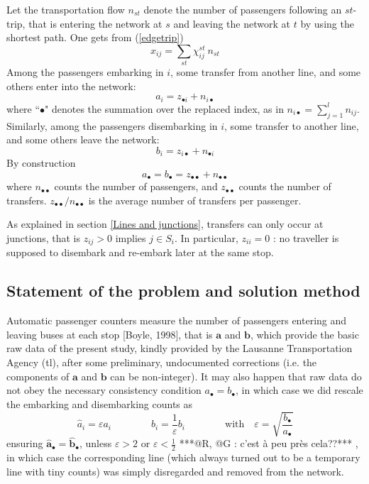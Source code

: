 \documentclass{bmcart}
\begin{document}
Let the transportation flow $n_{st}$ denote the number of passengers following an $st$-trip, that is entering the network at $s$ and leaving the network at $t$ by using the shortest path. One gets from (\ref{edgetrip}) 
\begin{equation}
\label{equationGG}
x_{ij}=\sum_{st}\chi_{ij}^{st}\:  n_{st}
\end{equation}
Among the passengers embarking in $i$, some transfer from another line, and some others enter into the network: 
\begin{equation}
\label{entrer}
a_i=z_{\bullet i}+n_{i\bullet}
\end{equation}
where  ``$\bullet$" denotes the summation over the replaced index, as in $n_{i\bullet}=\sum_{j=1}^l n_{ij}$. Similarly, among the passengers disembarking in $i$, some transfer to another line, and some others leave the network: 
\begin{equation}
\label{sortir}
b_i=z_{i\bullet}+n_{\bullet i}
\end{equation}
By construction
\begin{displaymath}
a_{\bullet}=b_{\bullet}=z_{\bullet\bullet}+n_{\bullet\bullet}
\end{displaymath}
where $n_{\bullet\bullet}$ counts the number of passengers, and $z_{\bullet\bullet}$ counts the number of transfers. $z_{\bullet\bullet}/n_{\bullet\bullet}$  is the average number of transfers per passenger. 

\vspace*{0.1cm}



As explained in section \ref{Lines and junctions}, transfers can only occur at junctions, that is $z_{ij}>0$ implies $j\in S_i$. In particular,  $z_{ii}=0$ : no traveller is supposed to disembark and re-embark later at the same stop. 


 
\subsection{Statement of the problem and solution method}
Automatic passenger counters measure the number of passengers entering and leaving buses at each stop [Boyle, 1998], that is $\mathbf{a}$ and $\mathbf{b}$, which provide the basic raw data of the present study, kindly provided by the Lausanne Transportation Agency (tl), after some preliminary, undocumented corrections (i.e. the components of $\mathbf{a}$ and $\mathbf{b}$ can be non-integer). It may also happen that raw data do not obey the necessary consistency condition  $a_\bullet=b_\bullet$, in which case we did rescale the embarking and disembarking counts as 
\begin{displaymath}
\hat{a}_i=\varepsilon a_i \qquad\qquad \hat{b}_i=\frac{1}{\varepsilon} b_i \qquad\qquad\mbox{with}\quad \varepsilon=\sqrt{\frac{b_\bullet}{a_\bullet}}
\end{displaymath}
ensuring $\hat{\mathbf{a}}_\bullet=\hat{\mathbf{b}}_\bullet$, unless $\varepsilon> 2$ or $\varepsilon<\frac{1}{2}$ ***@R, @G : c'est à peu près cela??*** , in which case the corresponding line (which always turned out to be a temporary line with tiny counts) was simply disregarded and removed from the network. 
\end{document}
